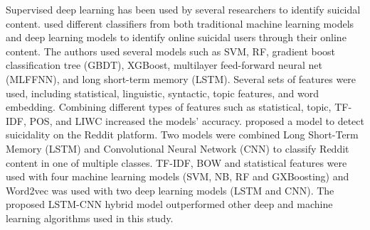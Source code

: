\documentclass[sn-mathphys,Numbered]{sn-jnl}%
\begin{document}
Supervised deep learning has been used by several researchers to identify suicidal content. \citet{9ji2018supervised} used different classifiers from both traditional machine learning models and deep learning models to identify online suicidal users through their online content. The authors used several models such as SVM, RF, gradient boost classification tree (GBDT), XGBoost, multilayer feed-forward neural net (MLFFNN), and long short-term memory (LSTM). Several sets of features were used, including statistical, linguistic, syntactic, topic features, and word embedding. Combining different types of features such as statistical, topic, TF-IDF, POS, and LIWC increased the models’ accuracy. \citet{25na13010007} proposed a model to detect suicidality on the Reddit platform. Two models were combined Long Short-Term Memory (LSTM) and Convolutional Neural Network (CNN) to classify Reddit content in one of multiple classes. TF-IDF, BOW and statistical features were used with four machine learning models (SVM, NB, RF and GXBoosting) and Word2vec was used with two deep learning models (LSTM and CNN). The proposed LSTM-CNN hybrid model outperformed other deep and machine learning algorithms used in this study. %
\end{document}
